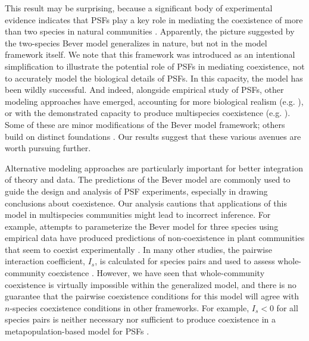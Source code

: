 \documentclass[11pt]{article}
\begin{document}
This result may be surprising, because a significant body of experimental evidence indicates that PSFs play a key role in mediating the coexistence of more than two species in natural communities \cite{kulmatiski2008plant,petermann2008janzen,mangan2010negative,bever2015maintenance}. Apparently, the picture suggested by the two-species Bever model generalizes in nature, but not in the model framework itself. We note that this framework was introduced as an intentional simplification to illustrate the potential role of PSFs in mediating coexistence, not to accurately model the biological details of PSFs. In this capacity, the model has been wildly successful. And indeed, alongside empirical study of PSFs, other modeling approaches have emerged, accounting for more biological realism (e.g. \cite{umbanhowar2005simple,eppstein2007invasiveness,bever2010rooting}), or with the demonstrated capacity to produce multispecies coexistence (e.g. \cite{bonanomi2005negative,miller2021metapopulations}). Some of these are minor modifications of the Bever model framework; others build on distinct foundations \cite{ke2015incorporating,ke2020effects}. Our results suggest that these various avenues are worth pursuing further.

Alternative modeling approaches are particularly important for better integration of theory and data. The predictions of the Bever model are commonly used to guide the design and analysis of PSF experiments, especially in drawing conclusions about coexistence. Our analysis cautions that applications of this model in multispecies communities might lead to incorrect inference. For example, attempts to parameterize the Bever model for three species using empirical data have produced predictions of non-coexistence in plant communities that seem to coexist experimentally \cite{kulmatiski2011testing}. In many other studies, the pairwise interaction coefficient, $I_s$, is calculated for species pairs and used to assess whole-community coexistence \cite{kulmatiski2008plant,fitzsimons2010importance,pendergast2013belowground,suding2013consequences,kuebbing2015plant,smith2015plant,bauer2017effects,kandlikar2019winning}. However, we have seen that whole-community coexistence is virtually impossible within the generalized model, and there is no guarantee that the pairwise coexistence conditions for this model will agree with $n$-species coexistence conditions in other frameworks. For example, $I_s < 0$ for all species pairs is neither necessary nor sufficient to produce coexistence in a metapopulation-based model for PSFs \cite{miller2021metapopulations}. 
\end{document}
